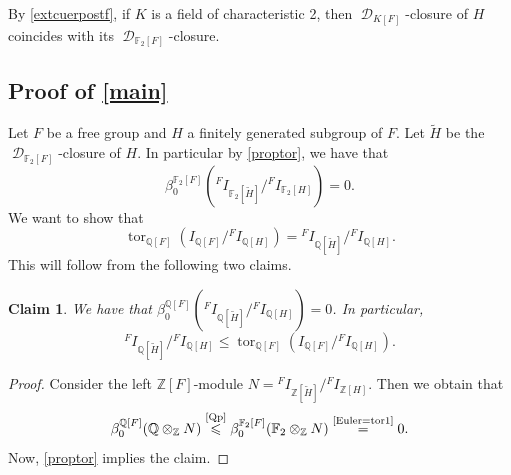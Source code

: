 \documentclass{amsart}
\newtheorem{claim}[lem]{Claim}
\theoremstyle{definition}
\theoremstyle{remark}
\DeclareMathOperator{\D}{\mathcal D}
\DeclareMathOperator{\tor}{tor}
\newcommand{\myeq}[1]{\ensuremath{\stackrel{\text{#1}}{=}}}
\newcommand{\myle}[1]{\ensuremath{\stackrel{\text{#1}}{\leqslant}}}
\newcommand{\Z}{\mathbb{Z}}
\newcommand{\F}{\mathbb{F}}
\newcommand{\Q}{\mathbb{Q}}
\begin{document}
By \cref{extcuerpostf}, if $K$ is a field of characteristic 2, then 
$\D_{K[F]}$-closure of $H$ coincides with its $\D_{\F_2[F]}$-closure.

\subsection{Proof of \cref{main}}
Let $F$ be a free group and $H$ a finitely generated subgroup of $F$. Let $\widetilde H$ be the $\D_{\F_2[F]}$-closure of $H$. In particular by \cref{proptor}, we have that
\begin{equation}\label {Euler=tor1}
\beta_0^{\F_2[F]}({}^FI_{\F_2[\widetilde H]}/{}^FI_{\F_2[H]})=0.
\end{equation}
 We want to show that 
$$\tor_{\Q[F]}(I_{\Q[F]}/{}^FI_{\Q[H]})={}^FI_{\Q[\widetilde H]}/{}^FI_{\Q[H]}.$$
This will follow from the following two claims.
\begin{claim} 
We have that $\beta_0^{\Q[F]}({}^FI_{\Q[\widetilde H]}/{}^FI_{\Q[H]})=0$. In particular, $$ {}^FI_{\Q[\widetilde H]}/{}^FI_{\Q[H]}\leq \tor_{\Q[F]}(I_{\Q[F]}/{}^FI_{\Q[H]}).$$

\end{claim}

\begin{proof}\renewcommand\qedsymbol{$\diamond$}
Consider the left $\Z[F]$-module   $N={}^FI_{\Z[\widetilde H]}/{}^FI_{\Z[H]}$.
Then we obtain that 
$$
\beta_0^{\Q[F]}(\Q\otimes_{\Z} N)\myle{\cref{Qp}}\beta_0^{\F_2[F]}(\F_2\otimes_{\Z} N)\myeq{\cref{Euler=tor1}} 0.$$
Now, \cref{proptor} implies the claim.
\end{proof}

 
\end{document}
